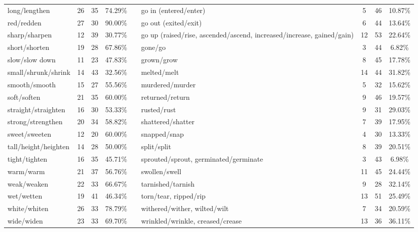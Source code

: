 \begin{tabular}{p{3cm}ccccp{3cm}ccc}
long/lengthen & 26 & 35 & 74.29\% & & go in (entered/enter) & 5 & 46 & 10.87\% \\
red/redden & 27 & 30 & 90.00\% & & go out (exited/exit) & 6 & 44 & 13.64\% \\
sharp/sharpen & 12 & 39 & 30.77\% & & go up (raised/rise, ascended/ascend, increased/increase, gained/gain) & 12 & 53 & 22.64\% \\
short/shorten & 19 & 28 & 67.86\% & & gone/go & 3 & 44 & 6.82\% \\
slow/slow down & 11 & 23 & 47.83\% & & grown/grow & 8 & 45 & 17.78\% \\
small/shrunk/shrink & 14 & 43 & 32.56\% & & melted/melt & 14 & 44 & 31.82\% \\
smooth/smooth & 15 & 27 & 55.56\% & & murdered/murder & 5 & 32 & 15.62\% \\
soft/soften & 21 & 35 & 60.00\% & & returned/return & 9 & 46 & 19.57\% \\
straight/straighten & 16 & 30 & 53.33\% & & rusted/rust & 9 & 31 & 29.03\% \\
strong/strengthen & 20 & 34 & 58.82\% & & shattered/shatter & 7 & 39 & 17.95\% \\
sweet/sweeten & 12 & 20 & 60.00\% & & snapped/snap & 4 & 30 & 13.33\% \\
tall/height/heighten & 14 & 28 & 50.00\% & & split/split & 8 & 39 & 20.51\% \\
tight/tighten & 16 & 35 & 45.71\% & & sprouted/sprout, germinated/germinate & 3 & 43 & 6.98\% \\
warm/warm & 21 & 37 & 56.76\% & & swollen/swell & 11 & 45 & 24.44\% \\
weak/weaken & 22 & 33 & 66.67\% & & tarnished/tarnish & 9 & 28 & 32.14\% \\
wet/wetten & 19 & 41 & 46.34\% & & torn/tear, ripped/rip & 13 & 51 & 25.49\% \\
white/whiten & 26 & 33 & 78.79\% & & withered/wither, wilted/wilt & 7 & 34 & 20.59\% \\
wide/widen & 23 & 33 & 69.70\% & & wrinkled/wrinkle, creased/crease & 13 & 36 & 36.11\%
\end{tabular}